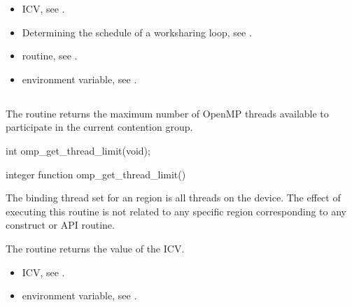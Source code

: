 \crossreferences
\begin{itemize}
\item {} ICV, see
.

\item Determining the schedule of a worksharing loop, see
.

\item {} routine, see
.

\item {} environment variable, see
.
\end{itemize}









\subsection{}
\label{subsec:omp_get_thread_limit}
\summary
The  routine returns the maximum number of OpenMP
threads available to participate in the current contention group.


\format
\begin{ccppspecific}
\begin{ompcFunction}
int omp_get_thread_limit(void);
\end{ompcFunction}
\end{ccppspecific}

\begin{fortranspecific}
\begin{ompfFunction}
integer function omp_get_thread_limit()
\end{ompfFunction}
\end{fortranspecific}

\binding
The binding thread set for an  region is all threads on the
device. The effect of executing this routine is not related to any specific region
corresponding to any construct or API routine.

\effect
The  routine returns the value of the  ICV.

\crossreferences
\begin{itemize}
\item {} ICV, see
.

\item {} environment variable, see
.
\end{itemize}








